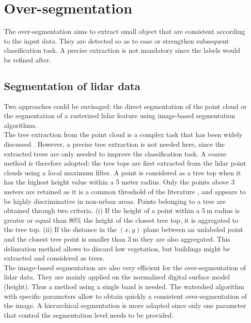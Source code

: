 \section{Over-segmentation}
The over-segmentation aims to extract small object that are consistent according to the input data. They are detected so as to ease or strengthen subsequent classification task. A precise extraction is not mandatory since the labels would be refined after.

\subsection{Segmentation of lidar data}
Two approaches could be envisaged: the direct segmentation of the point cloud or the segmentation of a rasterized lidar feature using image-based segmentation algorithms. \\

The tree extraction from the point cloud is a complex task that has been widely discussed \citep{dalponte2014tree, vega2014ptrees, kandare2014new}. However, a precise tree extraction is not needed here, since the extracted trees are only needed to improve the classification task. A coarse method is therefore adopted: the tree tops are first extracted from the lidar point clouds using a local maximum filter. A point is considered as a tree top when it has the highest height value within a 5 meter radius. Only the points above 3$\:$meters are retained as it is a common threshold of the literature \citep{eysn2012forest}, and appears to be highly discriminative in non-urban areas. Points belonging to a tree are obtained through two criteria. (i) If the height of a point within a 5$\:$m radius is greater or equal than 80\% the height of the closest tree top, it is aggregated to the tree top. (ii) If the distance in the  $(x,y)$ plane between an unlabeled point and the closest tree point is smaller than 3$\:$m  they are also aggregated. This delineation method allows to discard low vegetation, but buildings might be extracted and considered as trees. \\

The image-based segmentation are also very efficient for the over-segmentation of lidar data. They are mainly applied on the normalized digital surface model (height). Thus a method using a single band is needed. The watershed algorithm \citep{vincent1991watersheds} with specific parameters allow to obtain quickly a consistent over-segmentation of the image. A hierarchical segmentation \citep{guigues2006scale} is more adapted since only one parameter that control the segmentation level needs to be provided.

